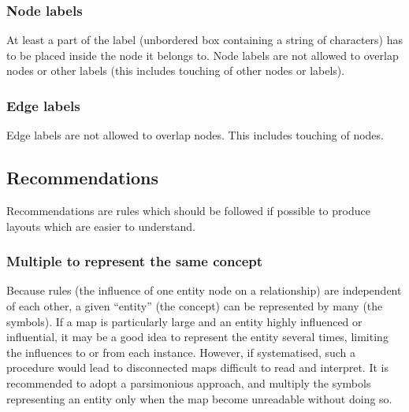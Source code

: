 \subsubsection{Node labels}

At least a part of the label (unbordered box containing a string of characters) has to be placed inside the node it belongs to. Node labels are not allowed to overlap nodes or other labels (this includes touching of other nodes or labels).

\subsubsection{Edge labels}

Edge labels are not allowed to overlap nodes. This includes touching of nodes.

%
%
\subsection{Recommendations}

Recommendations are rules which should be followed if possible to produce layouts which are easier to understand.

\subsubsection{Multiple  to represent the same concept}\label{multEnt}

Because rules (the influence of one entity node on a relationship) are independent of each other, a given ``entity'' (the concept) can be represented by many  (the symbols). If a map is particularly large and an entity highly influenced or influential, it may be a good idea to represent the entity several times, limiting the influences to or from each instance. However, if systematised, such a procedure would lead to disconnected maps difficult to read and interpret. It is recommended to adopt a parsimonious approach, and multiply the symbols representing an entity only when the map become unreadable without doing so.

